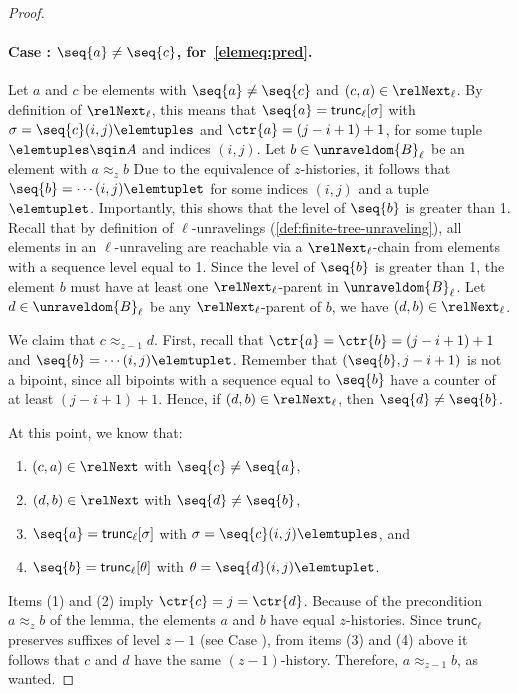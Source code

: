 \begin{proof}
  \paragraph{Case : $\seq{a} \ne \seq{c}$, for~\ref{elemeq:pred}.}
  Let $a$ and $c$ be elements with $\seq{a} \ne \seq{c}$ and $(c,a) \in \relNext_{\ell}$.
  By definition of $\relNext_{\ell}$, this means that $\seq{a} = \mathsf{trunc}_{\ell}[\sigma]$ with $\sigma = \seq{c}(i,j)\elemtuples$ and $\ctr{a} = (j-i+1)+1$, for some tuple $\elemtuples \sqin A$ and indices $(i,j)$.
  Let $b \in \unraveldom{B}_{\ell}$ be an element with $a \approx_{z} b$
  Due to the equivalence of $z$-histories, it follows that $\seq{b} = \cdots (i,j) \elemtuplet$ for some indices $(i,j)$ and a tuple $\elemtuplet$.
  Importantly, this shows that the level of $\seq{b}$ is greater than 1.
  Recall that by definition of $\ell$-unravelings (\cref{def:finite-tree-unraveling}), all elements in an $\ell$-unraveling are reachable via a $\relNext_{\ell}$-chain from elements with a sequence level equal to 1.
  Since the level of $\seq{b}$ is greater than 1, the element $b$ must have at least one $\relNext_{\ell}$-parent in $\unraveldom{B}_{\ell}$.
  Let $d \in \unraveldom{B}_{\ell}$ be any $\relNext_{\ell}$-parent of $b$, \ie{} we have $(d,b) \in \relNext_{\ell}$.

  We claim that $c \approx_{z-1} d$.
  First, recall that $\ctr{a} = \ctr{b} = (j-i+1)+1$ and $\seq{b} = \cdots(i,j) \elemtuplet$.
  Remember that $(\seq{b}, j-i+1)$ is not a bipoint, since all bipoints with a sequence equal to $\seq{b}$ have a counter of at least $(j-i+1)+1$.
  Hence, if $(d,b) \in \relNext_{\ell}$, then $\seq{d} \ne \seq{b}$.

  At this point, we know that:
  \begin{enumerate}
    \item $(c,a) \in \relNext$ with $\seq{c} \ne \seq{a}$,
    \item $(d,b) \in \relNext$ with $\seq{d} \ne \seq{b}$,
    \item $\seq{a} = \mathsf{trunc}_{\ell}[\sigma]$ with $\sigma = \seq{c}(i,j)\elemtuples$, and
    \item $\seq{b} = \mathsf{trunc}_{\ell}[\theta]$ with $\theta = \seq{d}(i,j)\elemtuplet$.
  \end{enumerate}
  Items (1) and (2) imply $\ctr{c} = j = \ctr{d}$.
  Because of the precondition $a \approx_{z} b$ of the lemma, the elements $a$ and $b$ have equal $z$-histories.
  Since $\mathsf{trunc}_{\ell}$ preserves suffixes of level $z-1$ (see Case ), from items (3) and (4) above it follows that $c$ and $d$ have the same $(z-1)$-history.
  Therefore, $a \approx_{z-1} b$, as wanted.
\end{proof}
